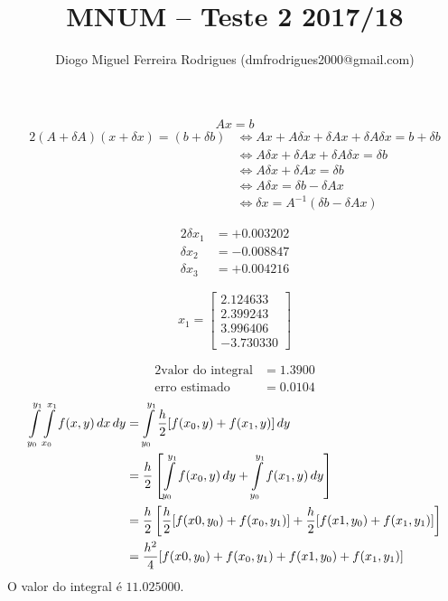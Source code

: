 \documentclass{mnum}
\title{MNUM -- Teste 2 2017/18}
\author{Diogo Miguel Ferreira Rodrigues (dmfrodrigues2000@gmail.com)}
\begin{document}
\setcounter{chapter}{16}

\begin{equation*}
	Ax=b
\end{equation*}
\begin{alignat*}{2}
	(A+\delta A)(x+\delta x) = (b+\delta b)
	&\iff Ax+A\delta x + \delta A x + \delta A \delta x = b + \delta b \\
	&\iff A\delta x + \delta A x + \delta A \delta x = \delta b \\
	&\iff A\delta x + \delta A x = \delta b \\
	&\iff A\delta x = \delta b - \delta A x \\
	&\iff \delta x = A^{-1}(\delta b - \delta A x)
\end{alignat*}

\begin{alignat*}{2}
		\delta x_1 &= +0.003202\\
		\delta x_2 &= -0.008847\\
		\delta x_3 &= +0.004216
\end{alignat*}

%
\begin{equation*}
	x_1 =
	\begin{bmatrix}
		2.124633 \\
		2.399243 \\
		3.996406 \\
		-3.730330
	\end{bmatrix}
\end{equation*}

%
\begin{alignat*}{2}
	\text{valor do integral} &= 1.3900\\
	\text{erro estimado}     &= 0.0104
\end{alignat*}
\begin{alignat*}{2}
	\int\displaylimits_{y_0}^{y_1}{\int\displaylimits_{x_0}^{x_1}{f(x,y)\,dx}\,dy}
	&= \int\displaylimits_{y_0}^{y_1}{\frac{h}{2}[f(x_0,y)+f(x_1,y)]\,dy}\\
	&= \frac{h}{2}\left[\int\displaylimits_{y_0}^{y_1}{f(x_0,y)\,dy}+\int\displaylimits_{y_0}^{y_1}{f(x_1,y)\,dy}\right]\\
	&= \frac{h}{2}\left[\frac{h}{2}[f(x0,y_0)+f(x_0,y_1)]+\frac{h}{2}[f(x1,y_0)+f(x_1,y_1)]\right]\\
	&= \frac{h^2}{4}[f(x0,y_0)+f(x_0,y_1)+f(x1,y_0)+f(x_1,y_1)]
\end{alignat*}
%
O valor do integral é $11.025000$.
\end{document}
